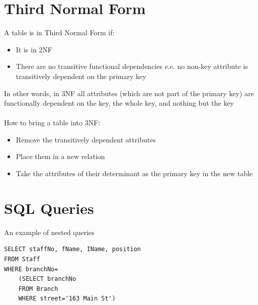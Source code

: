\documentclass{article}[18pt]
\begin{document}
\section{Third Normal Form}
A table is in Third Normal Form if:
\begin{itemize}
	\item It is in 2NF
	\item There are no transitive functional dependencies e.e. no non-key attribute is transitively dependent on the primary key
\end{itemize}
In other words, in 3NF all attributes (which are not part of the primary key) are functionally dependent on the key, the whole key, and nothing but the key\\
\\
How to bring a table into 3NF:
\begin{itemize}
	\item Remove the transitively dependent attributes
	\item Place them in a new relation
	\item Take the attributes of their determinant as the primary key in the new table
\end{itemize}
\section{SQL Queries}
An example of nested queries
\begin{verbatim}
SELECT staffNo, fName, IName, position
FROM Staff
WHERE branchNo=
	(SELECT branchNo
	FROM Branch
	WHERE street='163 Main St')
\end{verbatim}
\end{document}
